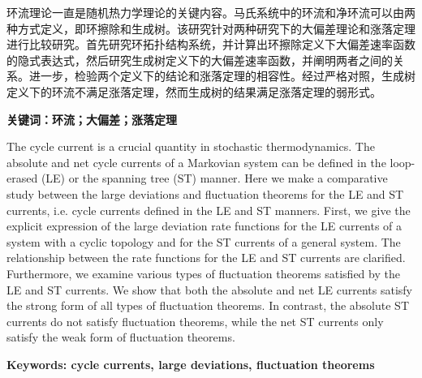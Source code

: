
\setcounter{page}{1}
\song{}

环流理论一直是随机热力学理论的关键内容。马氏系统中的环流和净环流可以由两种方式定义，即环擦除和生成树。该研究针对两种研究下的大偏差理论和涨落定理进行比较研究。首先研究环拓扑结构系统，并计算出环擦除定义下大偏差速率函数的隐式表达式，然后研究生成树定义下的大偏差速率函数，并阐明两者之间的关系。进一步，检验两个定义下的结论和涨落定理的相容性。经过严格对照，生成树定义下的环流不满足涨落定理，然而生成树的结果满足涨落定理的弱形式。

\vspace{\baselineskip}

\hangindent=52.3pt\noindent
{\bfseries\xiaosi\song 关键词：环流；大偏差；涨落定理}
\clearpage


The cycle current is a crucial quantity in stochastic thermodynamics. The absolute and net cycle currents of a Markovian system can be defined in the loop-erased (LE) or the spanning tree (ST) manner. Here we make a comparative study between the large deviations and fluctuation theorems for the LE and ST currents, i.e. cycle currents defined in the LE and ST manners. First, we give the explicit expression of the large deviation rate functions for the LE currents of a system with a cyclic topology and for the ST currents of a general system. The relationship between the rate functions for the LE and ST currents are clarified. Furthermore, we examine various types of fluctuation theorems satisfied by the LE and ST currents. We show that both the absolute and net LE currents satisfy the strong form of all types of fluctuation theorems. In contrast, the absolute ST currents do not satisfy fluctuation theorems, while the net ST currents only satisfy the weak form of fluctuation theorems.

\vspace{\baselineskip}

\hangindent=60pt\noindent
{\textbf{\xiaosi Keywords: cycle currents, large deviations, fluctuation theorems}}
\clearpage
